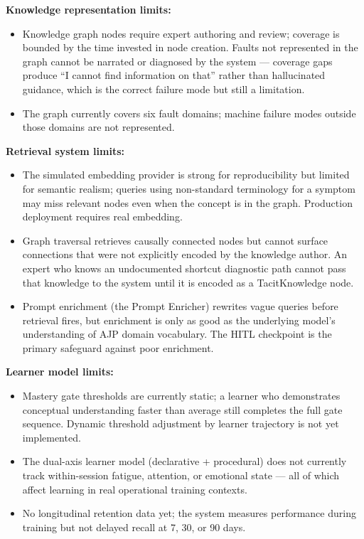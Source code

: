 \documentclass[11pt,letterpaper]{article}
\begin{document}
\textbf{Knowledge representation limits:}
\begin{itemize}
  \item Knowledge graph nodes require expert authoring and review; coverage is bounded by the time invested in node creation. Faults not represented in the graph cannot be narrated or diagnosed by the system --- coverage gaps produce ``I cannot find information on that'' rather than hallucinated guidance, which is the correct failure mode but still a limitation.
  \item The graph currently covers six fault domains; machine failure modes outside those domains are not represented.
\end{itemize}

\textbf{Retrieval system limits:}
\begin{itemize}
  \item The simulated embedding provider is strong for reproducibility but limited for semantic realism; queries using non-standard terminology for a symptom may miss relevant nodes even when the concept is in the graph. Production deployment requires real embedding.
  \item Graph traversal retrieves causally connected nodes but cannot surface connections that were not explicitly encoded by the knowledge author. An expert who knows an undocumented shortcut diagnostic path cannot pass that knowledge to the system until it is encoded as a TacitKnowledge node.
  \item Prompt enrichment (the Prompt Enricher) rewrites vague queries before retrieval fires, but enrichment is only as good as the underlying model's understanding of AJP domain vocabulary. The HITL checkpoint is the primary safeguard against poor enrichment.
\end{itemize}

\textbf{Learner model limits:}
\begin{itemize}
  \item Mastery gate thresholds are currently static; a learner who demonstrates conceptual understanding faster than average still completes the full gate sequence. Dynamic threshold adjustment by learner trajectory is not yet implemented.
  \item The dual-axis learner model (declarative + procedural) does not currently track within-session fatigue, attention, or emotional state --- all of which affect learning in real operational training contexts.
  \item No longitudinal retention data yet; the system measures performance during training but not delayed recall at 7, 30, or 90 days.
\end{itemize}
\end{document}

